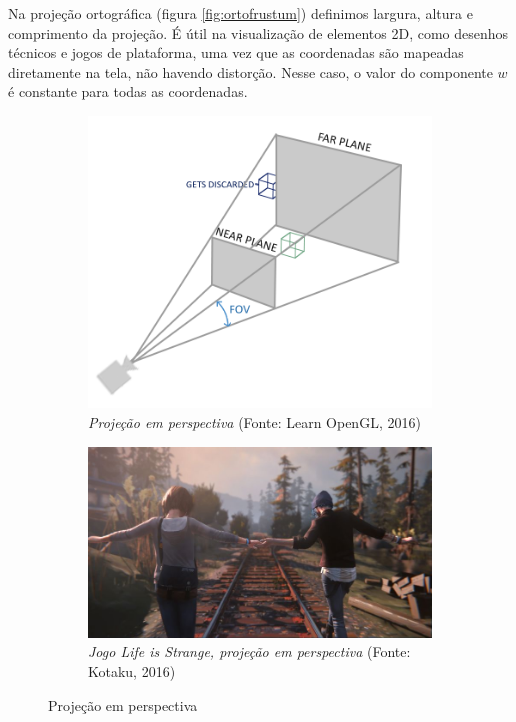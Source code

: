 Na projeção ortográfica (figura \ref{fig:ortofrustum}) definimos largura, altura e comprimento da projeção. É útil na visualização de elementos 2D, como desenhos técnicos e jogos de plataforma, uma vez que as coordenadas são mapeadas diretamente na tela, não havendo distorção. Nesse caso, o valor do componente $w$ é constante para todas as coordenadas.

\begin{figure}[H]
	\begin{subfigure}[b]{0.4\textwidth}
		\includegraphics[width=\textwidth]{imagens/perspective_frustum.png}
		\caption{\textit{Projeção em perspectiva} (Fonte: Learn OpenGL, 2016)}
		\label{fig:perspfrustum}
	\end{subfigure}
	\hfill
	\begin{subfigure}[b]{0.4\textwidth}
		\includegraphics[width=\textwidth]{imagens/life-is-strange.jpg}
		\caption{\textit{Jogo Life is Strange, projeção em perspectiva} (Fonte: Kotaku, 2016)}
		\label{fig:lifeisstrange}
	\end{subfigure}
	\caption{Projeção em perspectiva}
\end{figure}

